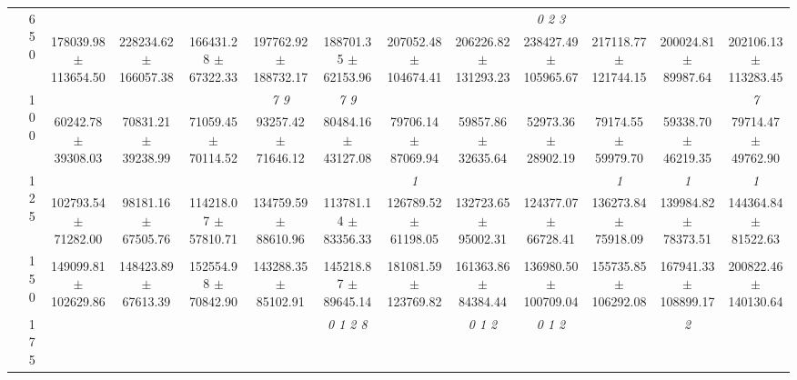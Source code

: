 \begin{table}[h]
{\begin{tabular}{
        ccccccccccccc}
 & \multirow{2}{*}{650}& & & & & & & & \textit{ 0 2 3 }& & &  \\ 
 & & 178039.98 $\pm$ 113654.50& 228234.62 $\pm$ 166057.38& 166431.28 $\pm$ 67322.33& 197762.92 $\pm$ 188732.17& 188701.35 $\pm$ 62153.96& 207052.48 $\pm$ 104674.41& 206226.82 $\pm$ 131293.23& 238427.49 $\pm$ 105965.67& 217118.77 $\pm$ 121744.15& 200024.81 $\pm$ 89987.64& 202106.13 $\pm$ 113283.45 \\ \midrule 
 & \multirow{2}{*}{100}& & & & \textit{ 7 9 }& \textit{ 7 9 }& & & & & & \textit{ 7 } \\ 
 & & 60242.78 $\pm$ 39308.03& 70831.21 $\pm$ 39238.99& 71059.45 $\pm$ 70114.52& 93257.42 $\pm$ 71646.12& 80484.16 $\pm$ 43127.08& 79706.14 $\pm$ 87069.94& 59857.86 $\pm$ 32635.64& 52973.36 $\pm$ 28902.19& 79174.55 $\pm$ 59979.70& 59338.70 $\pm$ 46219.35& 79714.47 $\pm$ 49762.90 \\ 
 & \multirow{2}{*}{125}& \cellcolor[HTML]{EFEFEF} & \cellcolor[HTML]{EFEFEF} & \cellcolor[HTML]{EFEFEF} & \cellcolor[HTML]{EFEFEF} & \cellcolor[HTML]{EFEFEF} & \cellcolor[HTML]{EFEFEF} \textit{ 1 }& \cellcolor[HTML]{EFEFEF} & \cellcolor[HTML]{EFEFEF} & \cellcolor[HTML]{EFEFEF} \textit{ 1 }& \cellcolor[HTML]{EFEFEF} \textit{ 1 }& \cellcolor[HTML]{EFEFEF} \textit{ 1 } \\ 
 & & \cellcolor[HTML]{EFEFEF} 102793.54 $\pm$ 71282.00& \cellcolor[HTML]{EFEFEF} 98181.16 $\pm$ 67505.76& \cellcolor[HTML]{EFEFEF} 114218.07 $\pm$ 57810.71& \cellcolor[HTML]{EFEFEF} 134759.59 $\pm$ 88610.96& \cellcolor[HTML]{EFEFEF} 113781.14 $\pm$ 83356.33& \cellcolor[HTML]{EFEFEF} 126789.52 $\pm$ 61198.05& \cellcolor[HTML]{EFEFEF} 132723.65 $\pm$ 95002.31& \cellcolor[HTML]{EFEFEF} 124377.07 $\pm$ 66728.41& \cellcolor[HTML]{EFEFEF} 136273.84 $\pm$ 75918.09& \cellcolor[HTML]{EFEFEF} 139984.82 $\pm$ 78373.51& \cellcolor[HTML]{EFEFEF} 144364.84 $\pm$ 81522.63 \\ 
 & \multirow{2}{*}{150}& & & & & & & & & & &  \\ 
 & & 149099.81 $\pm$ 102629.86& 148423.89 $\pm$ 67613.39& 152554.98 $\pm$ 70842.90& 143288.35 $\pm$ 85102.91& 145218.87 $\pm$ 89645.14& 181081.59 $\pm$ 123769.82& 161363.86 $\pm$ 84384.44& 136980.50 $\pm$ 100709.04& 155735.85 $\pm$ 106292.08& 167941.33 $\pm$ 108899.17& 200822.46 $\pm$ 140130.64 \\ 
 & \multirow{2}{*}{175}& \cellcolor[HTML]{EFEFEF} & \cellcolor[HTML]{EFEFEF} & \cellcolor[HTML]{EFEFEF} & \cellcolor[HTML]{EFEFEF} & \cellcolor[HTML]{EFEFEF} \textit{ 0 1 2 8 }& \cellcolor[HTML]{EFEFEF} & \cellcolor[HTML]{EFEFEF} \textit{ 0 1 2 }& \cellcolor[HTML]{EFEFEF} \textit{ 0 1 2 }& \cellcolor[HTML]{EFEFEF} & \cellcolor[HTML]{EFEFEF} \textit{ 2 }& \cellcolor[HTML]{EFEFEF}  \\ 

\end{tabular}}
\end{table}
